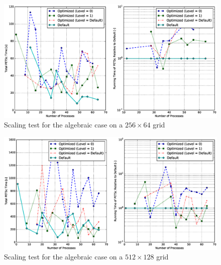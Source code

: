 \begin{figure}[h]
  \centering
  \includegraphics[width=\textwidth]{FIGURES/petsc-optimization/256x64-algebraic.eps}
  \caption{Scaling test for the algebraic case on a $256 \times 64$ grid}
  \label{fig:petsc-opt-scaling-algebraic-256}
\end{figure}

\begin{figure}[h]
  \centering
  \includegraphics[width=\textwidth]{FIGURES/petsc-optimization/512x128-algebraic.eps}
  \caption{Scaling test for the algebraic case on a $512 \times 128$ grid}
  \label{fig:petsc-opt-scaling-algebraic-512}
\end{figure}

